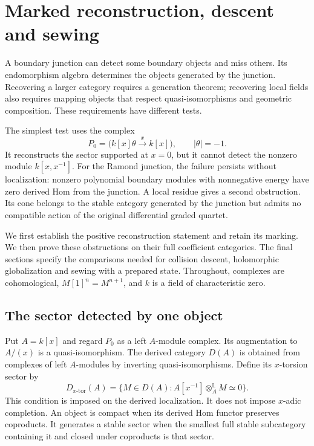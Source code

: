 \chapter{Marked reconstruction, descent and sewing}
\label{ch:vol2-marked-reconstruction}

A boundary junction can detect some boundary objects and miss others.
Its endomorphism algebra determines the objects generated by the
junction. Recovering a larger category requires a generation theorem;
recovering local fields also requires mapping objects that respect
quasi-isomorphisms and geometric composition. These requirements have
different tests.

The simplest test uses the complex
\[
 P_0=\bigl(k[x]\theta\xrightarrow{\ x\ }k[x]\bigr),
 \qquad |\theta|=-1.
\]
It reconstructs the sector supported at \(x=0\), but it cannot detect
the nonzero module \(k[x,x^{-1}]\). For the Ramond junction, the
failure persists without localization: nonzero polynomial boundary
modules with nonnegative energy have zero derived Hom from the junction.
A local residue gives a second obstruction. Its cone belongs to the
stable category generated by the junction but admits no compatible
action of the original differential graded quartet.

We first establish the positive reconstruction statement and retain
its marking. We then prove these obstructions on their full
coefficient categories. The final sections specify the comparisons
needed for collision descent, holomorphic globalization and sewing
with a prepared state. Throughout, complexes are cohomological,
\(M[1]^n=M^{n+1}\), and \(k\) is a field of characteristic zero.

\section{The sector detected by one object}
\label{sec:vol2-generated-sector}

Put \(A=k[x]\) and regard \(P_0\) as a left \(A\)-module complex.
Its augmentation to \(A/(x)\) is a quasi-isomorphism. The derived
category \(D(A)\) is obtained from complexes of left \(A\)-modules
by inverting quasi-isomorphisms. Define its \(x\)-torsion sector by
\begin{equation}\label{eq:vol2-torsion-sector}
 D_{x\text{-tor}}(A)
 =\{M\in D(A):A[x^{-1}]\otimes_A^{\mathbb L}M\simeq0\}.
\end{equation}
This condition is imposed on the derived localization. It does not
impose \(x\)-adic completion.
An object is compact when its derived Hom functor preserves
coproducts. It generates a stable sector when the smallest
full stable subcategory containing it and closed under
coproducts is that sector.

